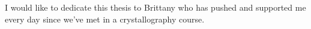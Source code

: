 I would like to dedicate this thesis to Brittany who has pushed and supported me every day since we've met in a crystallography course.